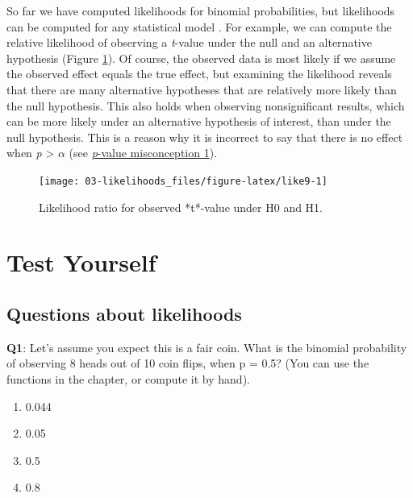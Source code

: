 \documentclass[
  oneside]{book}
\providecommand{\tightlist}{%
  \setlength{\itemsep}{0pt}\setlength{\parskip}{0pt}}
\begin{document}
So far we have computed likelihoods for binomial probabilities, but likelihoods can be computed for any statistical model \citep{glover_likelihood_2004, pawitan_all_2001}. For example, we can compute the relative likelihood of observing a \emph{t}-value under the null and an alternative hypothesis (Figure \ref{fig:like9}). Of course, the observed data is most likely if we assume the observed effect equals the true effect, but examining the likelihood reveals that there are many alternative hypotheses that are relatively more likely than the null hypothesis. This also holds when observing nonsignificant results, which can be more likely under an alternative hypothesis of interest, than under the null hypothesis. This is a reason why it is incorrect to say that there is no effect when \emph{p} \textgreater{} \(\alpha\) (see \protect\hyperlink{misconception1}{\emph{p}-value misconception 1}).

\begin{figure}

{\centering \texttt{[image: 03-likelihoods\_files/figure-latex/like9-1]} 

}

\caption{Likelihood ratio for observed *t*-value under H0 and H1.}\label{fig:like9}
\end{figure}

\hypertarget{test-yourself-2}{%
\section{Test Yourself}\label{test-yourself-2}}

\hypertarget{questions-about-likelihoods}{%
\subsection{Questions about likelihoods}\label{questions-about-likelihoods}}

\textbf{Q1}: Let's assume you expect this is a fair coin. What is the binomial probability of observing 8 heads out of 10 coin flips, when p = 0.5? (You can use the functions in the chapter, or compute it by hand).

\begin{enumerate}
\def\labelenumi{\Alph{enumi})}
\tightlist
\item
  0.044
\item
  0.05
\item
  0.5
\item
  0.8
\end{enumerate}
\end{document}
